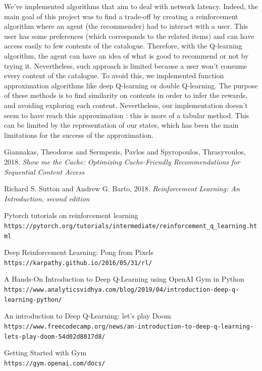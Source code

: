 \documentclass[a4paper]{article}
\begin{document}
We've implemented algorithms that aim to deal with network latency. Indeed, the main goal of this project was to find a trade-off by creating a reinforcement algorithm where an agent (the recommender) had to interact with a user. This user has some preferences (which corresponds to the related items) and can have access easily to few contents of the catalogue. Therefore, with the Q-learning algorithm, the agent can have an idea of what is good to recommend or not by trying it. Nevertheless, such approach is limited because a user won't consume every content of the catalogue. To avoid this, we implemented function approximation algorithms like deep Q-learning or double Q-learning. The purpose of these methods is to find similarity on contents in order to infer the rewards, and avoiding exploring each content. Nevertheless, our implementation doesn't seem to have reach this approximation : this is more of a tabular method.  This can be limited by the representation of our states, which has been the main limitations for the success of the approximation.





\begin{thebibliography}{99}



Giannakas, Theodoros and Sermpezis, Pavlos and Spyropoulos, Thrasyvoulos, 2018.
\textit{Show me the Cache: Optimizing Cache-Friendly Recommendations for Sequential Content Access}



Richard S. Sutton and Andrew G. Barto, 2018.
\textit{Reinforcement Learning: An Introduction, second edition}

Pytorch tutorials on reinforcement learning
\\\texttt{https://pytorch.org/tutorials/intermediate/reinforcement\_q\_learning.html}

Deep Reinforcement Learning: Pong from Pixels
\\\texttt{https://karpathy.github.io/2016/05/31/rl/}

A Hands-On Introduction to Deep Q-Learning using OpenAI Gym in Python
\\\texttt{https://www.analyticsvidhya.com/blog/2019/04/introduction-deep-q-learning-python/}

An introduction to Deep Q-Learning: let’s play Doom
\\\texttt{https://www.freecodecamp.org/news/an-introduction-to-deep-q-learning-lets-play-doom-54d02d8017d8/}

Getting Started with Gym
\\\texttt{https://gym.openai.com/docs/}









\end{thebibliography}
\end{document}
